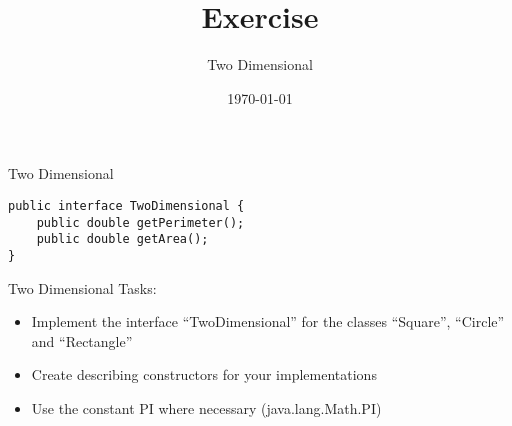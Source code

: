 


\title{Exercise}
\subtitle{Two Dimensional}
\date{\today}




\begin{frame}
    \titlepage
\end{frame}

\begin{frame}[fragile]{Two Dimensional}
   \begin{lstlisting}
public interface TwoDimensional {
    public double getPerimeter();
    public double getArea();
}\end{lstlisting}
\end{frame}

\begin{frame}{Two Dimensional}
    Tasks:
    \begin{itemize}
        \item Implement the interface ``TwoDimensional'' for the classes ``Square'', ``Circle'' and ``Rectangle''
        \item Create describing constructors for your implementations
        \item Use the constant PI where necessary (java.lang.Math.PI)
    \end{itemize}
\end{frame}



